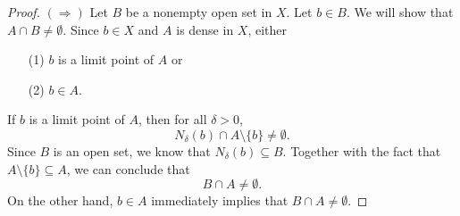 \documentclass[a4paper]{article}
\begin{document}
\begin{enumerate}
            \begin{proof}
            \( (\Longrightarrow) \) Let \( B  \) be a nonempty open set in \( X  \). Let \( b \in B  \). We will show that \( A \cap B \neq \emptyset \). Since \( b \in X  \) and \( A  \) is dense in \( X  \), either 
            \begin{enumerate}
                \item[(1)] \( b   \) is a limit point of \( A  \) or
                \item[(2)] \( b \in A  \).
            \end{enumerate}
            If \( b  \) is a limit point of \( A  \), then for all \( \delta > 0  \), 
            \[  {N}_{\delta}(b) \cap A \setminus  \{ b \} \neq \emptyset.  \]
            Since \( B \) is an open set, we know that \( {N}_{\delta}(b) \subseteq B \). Together with the fact that \( A \setminus  \{ b \} \subseteq  A  \), we can conclude that 
            \[  B \cap A \neq \emptyset. \]
            On the other hand, \( b \in A  \) immediately implies that \( B \cap A \neq \emptyset \).


\end{proof}
\end{enumerate}
\end{document}

